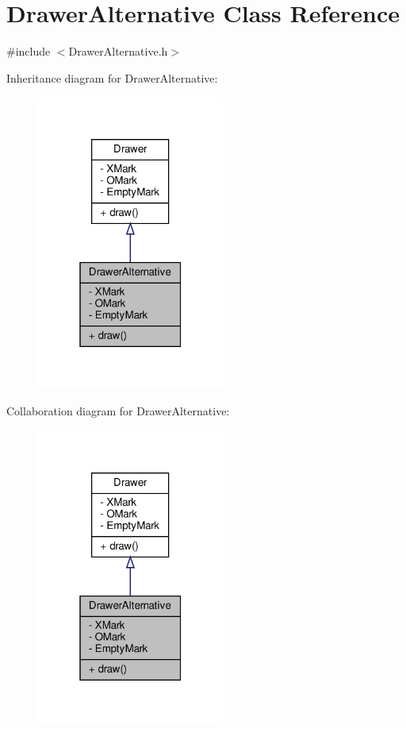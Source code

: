 \hypertarget{classDrawerAlternative}{}\section{Drawer\+Alternative Class Reference}
\label{classDrawerAlternative}


{\ttfamily \#include $<$Drawer\+Alternative.\+h$>$}



Inheritance diagram for Drawer\+Alternative\+:
\nopagebreak
\begin{figure}[H]
\begin{center}
\leavevmode
\includegraphics[width=175pt]{classDrawerAlternative__inherit__graph}
\end{center}
\end{figure}


Collaboration diagram for Drawer\+Alternative\+:
\nopagebreak
\begin{figure}[H]
\begin{center}
\leavevmode
\includegraphics[width=175pt]{classDrawerAlternative__coll__graph}
\end{center}
\end{figure}
